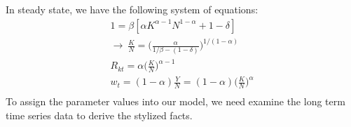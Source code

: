 \documentclass[12pt]{article}
\theoremstyle{definition}
\numberwithin{equation}{section}
\numberwithin{figure}{section}
\numberwithin{table}{section}
\begin{document}
In steady state, we have the following system of equations:
\begin{gather*}
  1 = \beta [\alpha K^{\alpha - 1}N^{1-\alpha} + 1 - \delta] \\
\rightarrow \   \frac{K}{N} = \bigg ( \frac{\alpha}{1/\beta - (1 - \delta)} \bigg)^{1/(1-\alpha)} \\
  R_{kt} = \alpha \big (\frac{K}{N}\big)^{\alpha - 1} \\
  w_t = (1-\alpha) \frac{Y}{N} = (1 - \alpha) \big (\frac{K}{N}\big)^\alpha  \\
\end{gather*}
To assign the parameter values into our model, we need examine the long term time series data to derive the stylized facts.

























\newpage


\end{document}
